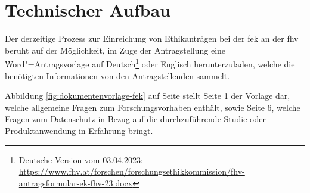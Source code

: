 \documentclass[a4paper,12pt,twoside]{scrreprt}
\begin{document}
\section{Technischer Aufbau}
\label{sec:technischer-aufbau}

Der derzeitige Prozess zur Einreichung von Ethikanträgen bei der \ac{fek} an der \ac{fhv} beruht auf der Möglichkeit, im Zuge der Antragstellung eine Word"=Antragsvorlage auf Deutsch\footnote{Deutsche Version vom 03.04.2023: \url{https://www.fhv.at/forschen/forschungsethikkommission/fhv-antragsformular-ek-fhv-23.docx}} oder Englisch herunterzuladen, welche die benötigten Informationen von den Antragstellenden sammelt.

Abbildung \ref{fig:dokumentenvorlage-fek} auf Seite \pageref{fig:dokumentenvorlage-fek} stellt Seite 1 der Vorlage dar, welche allgemeine Fragen zum Forschungsvorhaben enthält, sowie Seite 6, welche Fragen zum Datenschutz in Bezug auf die durchzuführende Studie oder Produktanwendung in Erfahrung bringt.
\end{document}
